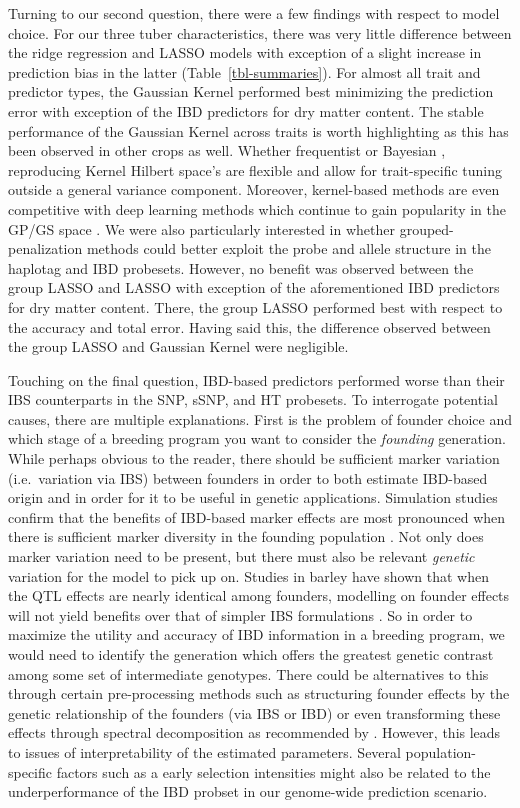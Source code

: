 Turning to our second question, there were a few findings with respect
to model choice. For our three tuber characteristics, there was very
little difference between the ridge regression and LASSO models with
exception of a slight increase in prediction bias in the latter
(Table~\ref{tbl-summaries}). For almost all trait and predictor types,
the Gaussian Kernel performed best minimizing the prediction error with
exception of the IBD predictors for dry matter content. The stable
performance of the Gaussian Kernel across traits is worth highlighting
as this has been observed in other crops as well. Whether frequentist
\autocite{Endelman2011} or Bayesian \autocite{Gianola2008}, reproducing
Kernel Hilbert space's are flexible and allow for trait-specific tuning
outside a general variance component. Moreover, kernel-based methods are
even competitive with deep learning methods which continue to gain
popularity in the GP/GS space \autocite{Crossa2019}. We were also
particularly interested in whether grouped-penalization methods could
better exploit the probe and allele structure in the haplotag and IBD
probesets. However, no benefit was observed between the group LASSO and
LASSO with exception of the aforementioned IBD predictors for dry matter
content. There, the group LASSO performed best with respect to the
accuracy and total error. Having said this, the difference observed
between the group LASSO and Gaussian Kernel were negligible.

Touching on the final question, IBD-based predictors performed worse
than their IBS counterparts in the SNP, sSNP, and HT probesets. To
interrogate potential causes, there are multiple explanations. First is the problem of founder choice and which stage of
a breeding program you want to consider the \emph{founding} generation.
While perhaps obvious to the reader, there should be sufficient marker
variation (i.e.~variation via IBS) between founders in order to both
estimate IBD-based origin and in order for it to be useful in genetic
applications. Simulation studies confirm that the benefits of IBD-based
marker effects are most pronounced when there is sufficient marker
diversity in the founding population \autocite{ThereseNavarro2022}. Not
only does marker variation need to be present, but there must also be
relevant \emph{genetic} variation for the model to pick up on. Studies
in barley have shown that when the QTL effects are nearly identical
among founders, modelling on founder effects will not yield benefits
over that of simpler IBS formulations \autocite{Maurer2016,Maurer2017}.
So in order to maximize the utility and accuracy of IBD information in a
breeding program, we would need to identify the generation which offers
the greatest genetic contrast among some set of intermediate genotypes.
There could be alternatives to this through certain pre-processing
methods such as structuring founder effects by the genetic relationship
of the founders (via IBS or IBD) or even transforming these effects
through spectral decomposition as recommended by
\autocite{VanEeuwijk2010}. However, this leads to issues of
interpretability of the estimated parameters. Several population-specific factors such as a early selection intensities might also be related to the underperformance of the IBD probset in
our genome-wide prediction scenario.

